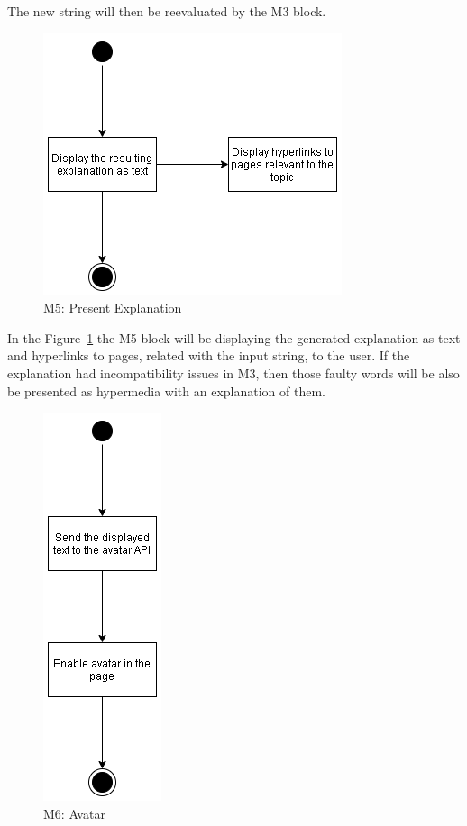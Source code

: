 The new string will then be reevaluated by the M3 block.

\begin{figure}[H]
\centering
\includegraphics[scale=0.5]{ch4/assets/M5.png}
\caption[Present Explanation Module]{M5: Present Explanation}
\label{fig:M5}
\end{figure}

In the Figure~\ref{fig:M5} the M5 block will be displaying the generated explanation as text and hyperlinks to pages, related with the input string, to the user.
If the explanation had incompatibility issues in M3, then those faulty words will be also be presented as hypermedia with an explanation of them.

\begin{figure}[H]
\centering
\includegraphics[scale=0.5]{ch4/assets/M6.png}
\caption[Avatar Module]{M6: Avatar}
\label{fig:M6}
\end{figure}


